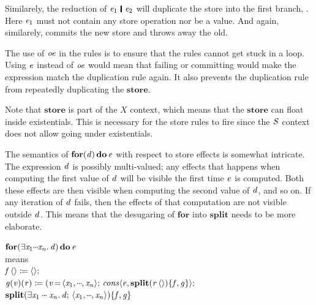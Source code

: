 Similarely, the reduction of \ensuremath{\Varid{e}_{\mathrm{1}}\hspace{0.2em}\mathop{\rule[-0.1em]{0.15em}{0.75em}}\hspace{0.2em}\Varid{e}_{\mathrm{2}}} will duplicate the store into the first branch, .
Here \ensuremath{\Varid{e}_{\mathrm{1}}} must not contain any store operation nor be a value.
And again, similarely,  commits the new store and throws away the old.

The use of \ensuremath{\Varid{oe}} in the rules is to ensure that the rules cannot get stuck in a loop.
Using \ensuremath{\Varid{e}} instead of \ensuremath{\Varid{oe}} would mean that failing or committing would make the expression match the duplication rule again.
It also prevents the duplication rule from repeatedly duplicating the \ensuremath{\textbf{store}}.

Note that \ensuremath{\textbf{store}} is part of the \ensuremath{X} context, which means that the \ensuremath{\textbf{store}} can float inside
existentials.
This is necessary for the store rules to fire since the \ensuremath{\Conid{S}} context does not allow
going under existentials.

The semantics of \ensuremath{\textbf{for}(\Varid{d})\,\textbf{do}\,\Varid{e}} with respect to store effects is somewhat intricate.
The expression \ensuremath{\Varid{d}} is possibly multi-valued; any effects that happens when computing the
first value of \ensuremath{\Varid{d}} will be visible the first time \ensuremath{\Varid{e}} is computed.
Both these effects are then visible when computing the second value of \ensuremath{\Varid{d}}, and so on.
If any iteration of \ensuremath{\Varid{d}} fails, then the effects of that computation are not visible outside \ensuremath{\Varid{d}}.
This means that the desugaring of \ensuremath{\textbf{for}} into \ensuremath{\textbf{split}} needs to be more elaborate.

\ensuremath{\textbf{for}(\exists\Varid{x}_{\mathrm{1}} \mydots \Varid{x}_{\Varid{n}}.\,\Varid{d})\,\textbf{do}\,\Varid{e}}\\
means\\
\hspace*{5mm}\ensuremath{\Varid{f}\,\langle\rangle\mathrel{\coloneqq}\langle\rangle;\,}\\
\hspace*{5mm}\ensuremath{\Varid{g} (\Varid{v}) (\Varid{r})\mathrel{\coloneqq}(\Varid{v}\hspace{-0.14em}=\hspace{-0.14em}\langle{}\Varid{x}_{\mathrm{1}},\mydots,\Varid{x}_{\Varid{n}}\rangle;\,\Varid{cons}\langle\Varid{e},\textbf{split}(\Varid{r}\,\langle\rangle)\{\Varid{f},\Varid{g}\}\rangle;\,}\\
\hspace*{5mm}\ensuremath{\textbf{split}(\exists\Varid{x}_{\mathrm{1}}\;\mydots\;\Varid{x}_{\Varid{n}}.\,\Varid{d};\,\langle{}\Varid{x}_{\mathrm{1}},\mydots,\Varid{x}_{\Varid{n}}\rangle)\{\Varid{f},\Varid{g}\}}

